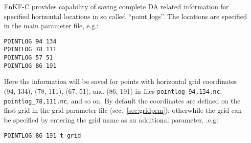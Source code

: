 \documentclass[11pt]{report}
\begin{document}
EnKF-C provides capability of saving complete DA related information for specified horizontal locations in so called ``point logs''.
The locations are specified in the main parameter file, e.g.:
\begin{Verbatim}
POINTLOG 94 134
POINTLOG 78 111
POINTLOG 57 51
POINTLOG 86 191
\end{Verbatim}
Here the information will be saved for points with horizontal grid coordinates (94, 134), (78, 111), (67, 51), and (86, 191) in files \verb|pointlog_94,134.nc|, \verb|pointlog_78,111.nc|, and so on.
By default the coordinates are defined on the first grid in the grid parameter file (sec.~\ref{sec:gridprm}); otherwhile the grid can be specified by entering the grid name as an additional parameter, .e.g:
\begin{Verbatim}
POINTLOG 86 191 t-grid
\end{Verbatim}
\end{document}
